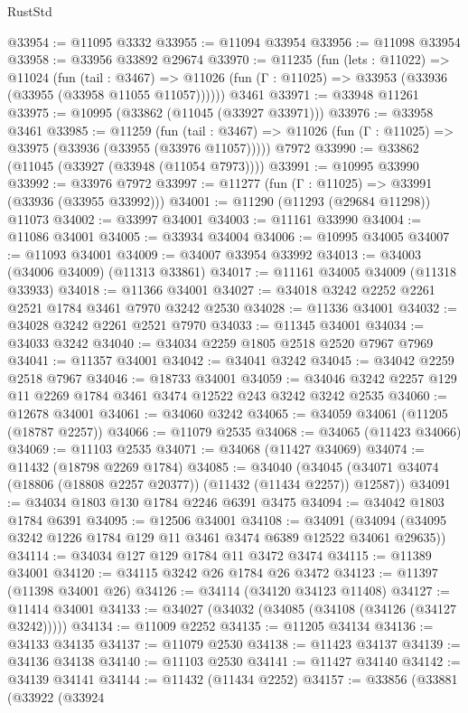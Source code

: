 \begin{lexlean}{RustStd}
\begin{coremodule}
@33954 := @11095 @3332
@33955 := @11094 @33954
@33956 := @11098 @33954
@33958 := @33956 @33892 @29674
@33970 := @11235
    (fun (lets : @11022) =>
    @11024
      (fun (tail : @3467) =>
      @11026 (fun (Γ : @11025) => @33953 (@33936 (@33955 (@33958 @11055 @11057))))))
    @3461
@33971 := @33948 @11261
@33975 := @10995 (@33862 (@11045 (@33927 @33971)))
@33976 := @33958 @3461
@33985 := @11259
    (fun (tail : @3467) => @11026 (fun (Γ : @11025) => @33975 (@33936 (@33955 (@33976 @11057)))))
    @7972
@33990 := @33862 (@11045 (@33927 (@33948 (@11054 @7973))))
@33991 := @10995 @33990
@33992 := @33976 @7972
@33997 := @11277 (fun (Γ : @11025) => @33991 (@33936 (@33955 @33992)))
@34001 := @11290 (@11293 (@29684 @11298)) @11073
@34002 := @33997 @34001
@34003 := @11161 @33990
@34004 := @11086 @34001
@34005 := @33934 @34004
@34006 := @10995 @34005
@34007 := @11093 @34001
@34009 := @34007 @33954 @33992
@34013 := @34003 (@34006 @34009) (@11313 @33861)
@34017 := @11161 @34005 @34009 (@11318 @33933)
@34018 := @11366 @34001
@34027 := @34018 @3242 @2252 @2261 @2521 @1784 @3461 @7970 @3242 @2530
@34028 := @11336 @34001
@34032 := @34028 @3242 @2261 @2521 @7970
@34033 := @11345 @34001
@34034 := @34033 @3242
@34040 := @34034 @2259 @1805 @2518 @2520 @7967 @7969
@34041 := @11357 @34001
@34042 := @34041 @3242
@34045 := @34042 @2259 @2518 @7967
@34046 := @18733 @34001
@34059 := @34046 @3242 @2257 @129 @11 @2269 @1784 @3461 @3474 @12522 @243 @3242 @3242 @2535
@34060 := @12678 @34001
@34061 := @34060 @3242
@34065 := @34059 @34061 (@11205 (@18787 @2257))
@34066 := @11079 @2535
@34068 := @34065 (@11423 @34066)
@34069 := @11103 @2535
@34071 := @34068 (@11427 @34069)
@34074 := @11432 (@18798 @2269 @1784)
@34085 := @34040
    (@34045 (@34071 @34074 (@18806 (@18808 @2257 @20377)) (@11432 (@11434 @2257)) @12587))
@34091 := @34034 @1803 @130 @1784 @2246 @6391 @3475
@34094 := @34042 @1803 @1784 @6391
@34095 := @12506 @34001
@34108 := @34091 (@34094 (@34095 @3242 @1226 @1784 @129 @11 @3461 @3474 @6389 @12522 @34061 @29635))
@34114 := @34034 @127 @129 @1784 @11 @3472 @3474
@34115 := @11389 @34001
@34120 := @34115 @3242 @26 @1784 @26 @3472
@34123 := @11397 (@11398 @34001 @26)
@34126 := @34114 (@34120 @34123 @11408)
@34127 := @11414 @34001
@34133 := @34027 (@34032 (@34085 (@34108 (@34126 (@34127 @3242)))))
@34134 := @11009 @2252
@34135 := @11205 @34134
@34136 := @34133 @34135
@34137 := @11079 @2530
@34138 := @11423 @34137
@34139 := @34136 @34138
@34140 := @11103 @2530
@34141 := @11427 @34140
@34142 := @34139 @34141
@34144 := @11432 (@11434 @2252)
@34157 := @33856
    (@33881
      (@33922
        (@33924

\end{coremodule}
\end{lexlean}

